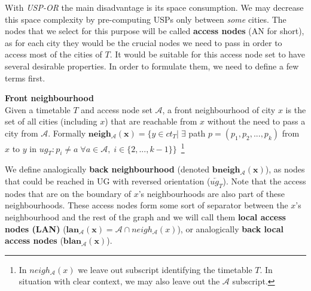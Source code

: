 	With \textit{USP-OR} the main disadvantage is its space consumption. We may decrease this space complexity by pre-computing USPs only between \textit{some} cities. The nodes that we select for this purpose will be called \textbf{access nodes} (AN for short), as for each city they would be the crucial nodes we need to pass in order to access most of the cities of $T$. It would be suitable for this access node set to have several desirable properties. In order to formulate them, we need to define a few terms first.
	
	\begin{definition}
        \textbf{Front neighbourhood} \\
		Given a timetable $T$ and access node set $\mathcal{A}$, a front neighbourhood of city $x$ is the set of all cities (including $x$) that are reachable from $x$ without the need to pass a city from $\mathcal{A}$. Formally $\bm{neigh_{\mathcal{A}}(x)} = \{y \in ct_{T}| \; \exists$ path $p = (p_{1}, p_{2}, ..., p_{k})$ from $x$ to $y$ in $ug_{T}: p_{i} \neq a \; \forall a \in \mathcal{A}, \; i \in \{2, ..., k - 1\} \}$~\footnote{In $neigh_{\mathcal{A}}(x)$ we leave out subscript identifying the timetable $T$. In situation with clear context, we may also leave out the $\mathcal{A}$ subscript.}
    \end{definition}
    
    \noindent We define analogically \textbf{back neighbourhood} (denoted $\bm{bneigh_{\mathcal{A}}(x)}$), as nodes that could be reached in UG with reversed orientation ($\overleftarrow{ug_{T}}$). Note that the access nodes that are on the boundary of $x$'s neighbourhoods are also part of these neighbourhoods. These access nodes form some sort of separator between the $x$'s neighbourhood and the rest of the graph and we will call them \textbf{local access nodes (LAN)} ($\bm{lan_{\mathcal{A}}(x)} = \mathcal{A} \cap neigh_{\mathcal{A}}(x)$), or analogically \textbf{back local access nodes} ($\bm{blan_{\mathcal{A}}(x)}$). \\
    
